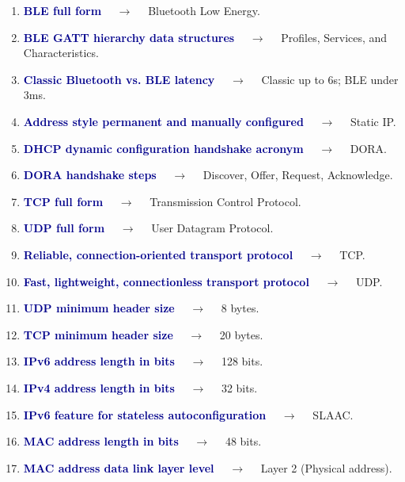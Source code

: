 \documentclass[11pt,a4paper]{article}
\begin{document}
\begin{enumerate}[label=\arabic*., leftmargin=*, labelsep=0.8em, itemsep=0.35em, parsep=0.1em, topsep=0.2em]
  \item \textcolor{darkblue}{\textbf{BLE full form}} $\quad\to\quad$ Bluetooth Low Energy.
  \item \textcolor{darkblue}{\textbf{BLE GATT hierarchy data structures}} $\quad\to\quad$ Profiles, Services, and Characteristics.
  \item \textcolor{darkblue}{\textbf{Classic Bluetooth vs. BLE latency}} $\quad\to\quad$ Classic up to 6s; BLE under 3ms.
  \item \textcolor{darkblue}{\textbf{Address style permanent and manually configured}} $\quad\to\quad$ Static IP.
  \item \textcolor{darkblue}{\textbf{DHCP dynamic configuration handshake acronym}} $\quad\to\quad$ DORA.
  \item \textcolor{darkblue}{\textbf{DORA handshake steps}} $\quad\to\quad$ Discover, Offer, Request, Acknowledge.
  \item \textcolor{darkblue}{\textbf{TCP full form}} $\quad\to\quad$ Transmission Control Protocol.
  \item \textcolor{darkblue}{\textbf{UDP full form}} $\quad\to\quad$ User Datagram Protocol.
  \item \textcolor{darkblue}{\textbf{Reliable, connection-oriented transport protocol}} $\quad\to\quad$ TCP.
  \item \textcolor{darkblue}{\textbf{Fast, lightweight, connectionless transport protocol}} $\quad\to\quad$ UDP.
  \item \textcolor{darkblue}{\textbf{UDP minimum header size}} $\quad\to\quad$ 8 bytes.
  \item \textcolor{darkblue}{\textbf{TCP minimum header size}} $\quad\to\quad$ 20 bytes.
  \item \textcolor{darkblue}{\textbf{IPv6 address length in bits}} $\quad\to\quad$ 128 bits.
  \item \textcolor{darkblue}{\textbf{IPv4 address length in bits}} $\quad\to\quad$ 32 bits.
  \item \textcolor{darkblue}{\textbf{IPv6 feature for stateless autoconfiguration}} $\quad\to\quad$ SLAAC.
  \item \textcolor{darkblue}{\textbf{MAC address length in bits}} $\quad\to\quad$ 48 bits.
  \item \textcolor{darkblue}{\textbf{MAC address data link layer level}} $\quad\to\quad$ Layer 2 (Physical address).

\end{enumerate}
\end{document}
